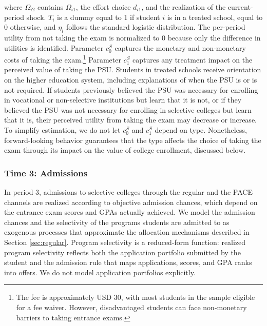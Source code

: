 \noindent where $\Omega_{i2}$ contains $\Omega_{i1}$, the effort choice $d_{i1}$, and the realization of the current-period shock. $T_i$ is a dummy equal to 1 if student $i$ is in a treated school, equal to $0$ otherwise, and $\eta_i$ follows the standard logistic distribution. The per-period utility from not taking the exam is normalized to $0$ because only the difference in utilities is identified. Parameter $c^S_{0}$ captures the monetary and non-monetary costs of taking the exam.\footnote{The fee is approximately USD 30, with most students in the sample eligible for a fee waiver. However, disadvantaged students can face non-monetary barriers to taking entrance exams.} Parameter $c^S_1$ captures any treatment impact on the perceived value of taking the PSU. Students in treated schools receive orientation on the higher education system, including explanations of when the PSU is or is not required. If students previously believed the PSU was necessary for enrolling in vocational or non-selective institutions but learn that it is not, or if they believed the PSU was not necessary for enrolling in selective colleges but learn that it is, their perceived utility from taking the exam may decrease or increase. To simplify estimation, we do not let $c_0^S$ and $c_1^S$ depend on type. Nonetheless, forward-looking behavior guarantees that the type affects the choice of taking the exam through its impact on the value of college enrollment, discussed below.  \par 




\subsubsection{Time 3: Admissions}\label{sec:admissions}




In period 3, admissions to selective colleges through the regular and the PACE channels are realized according to objective admission chances, which depend on the entrance exam scores and GPAs actually achieved. We model the admission chances and the selectivity of the programs students are admitted to as exogenous processes that approximate the allocation mechanisms described in Section \ref{sec:regular}. Program selectivity is a reduced-form function: realized program selectivity reflects both the application portfolio submitted by the student and the admission rule that maps applications, scores, and GPA ranks into offers. We do not model application portfolios explicitly.\par 

